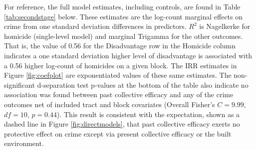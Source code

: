 \documentclass [11pt, proquest] {uwthesis}[2015/03/03]
\begin{document}
For reference, the full model estimates, including controls, are found in Table \ref{tab:secondstage} below. These estimates are the log-count marginal effects on crime from one standard deviation differences in predictors. \(R^{2}\) is Nagelkerke for homicide (single-level model) and marginal Trigamma for the other outcomes. That is, the value of 0.56 for the Disadvantage row in the Homicide column indicates a one standard deviation higher level of disadvantage is associated with a 0.56 higher log-count of homicides on a given block. The IRR estimates in Figure \ref{fig:coefplot} are exponentiated values of these same estimates. The non-significant d-separation test p-values at the bottom of the table also indicate no association was found between past collective efficacy and any of the crime outcomes net of included tract and block covariates (Overall Fisher's \(C = 9.99\), \(df = 10\), \(p = 0.44\)). This result is consistent with the expectation, shown as a dashed line in Figure \ref{fig:directmodels}, that past collective efficacy exerts no protective effect on crime except via present collective efficacy or the built environment.\linebreak
\linebreak

\clearpage
\providecommand{\docline}[3]{\noalign{\global\setlength{\arrayrulewidth}{#1}}\arrayrulecolor[HTML]{#2}\cline{#3}}

\setlength{\tabcolsep}{4pt}
\end{document}
